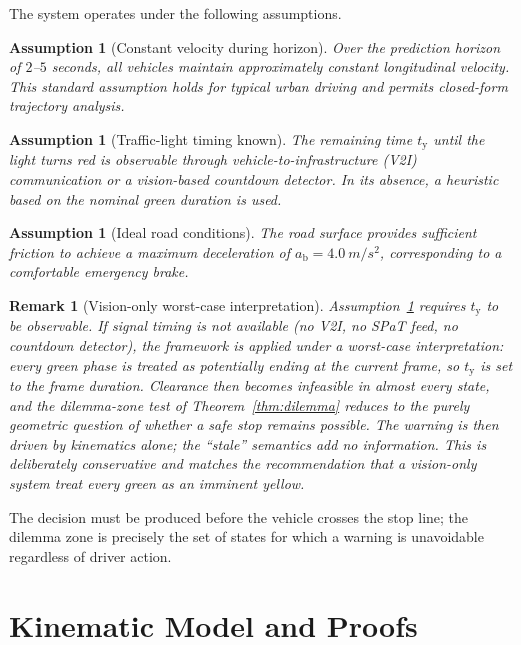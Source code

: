\documentclass[conference, a4paper]{IEEEtran}
\theoremstyle{plain}
\newtheorem{assumption}[theorem]{Assumption}
\newtheorem{remark}[theorem]{Remark}
\newcommand{\tred}{t_{\mathrm{y}}}
\newcommand{\ab}{a_{\mathrm{b}}}
\begin{document}
The system operates under the following assumptions.

\begin{assumption}[Constant velocity during horizon]
\label{asm:cv}
Over the prediction horizon of $2$--$5$ seconds, all vehicles maintain
approximately constant longitudinal velocity. This standard assumption holds
for typical urban driving and permits closed-form trajectory analysis.
\end{assumption}

\begin{assumption}[Traffic-light timing known]
\label{asm:signal}
The remaining time $\tred$ until the light turns red is observable through
vehicle-to-infrastructure (V2I) communication or a vision-based countdown
detector. In its absence, a heuristic based on the nominal green duration is
used.
\end{assumption}

\begin{assumption}[Ideal road conditions]
\label{asm:braking}
The road surface provides sufficient friction to achieve a maximum
deceleration of $\ab = 4.0~\si{m/s^2}$, corresponding to a comfortable
emergency brake.
\end{assumption}

\begin{remark}[Vision-only worst-case interpretation]
\label{rem:worstcase}
Assumption~\ref{asm:signal} requires $\tred$ to be observable. If signal
timing is not available (no V2I, no SPaT feed, no countdown detector), the
framework is applied under a worst-case interpretation: every green phase is
treated as potentially ending at the current frame, so $\tred$ is set to the
frame duration. Clearance then becomes infeasible in almost every state, and
the dilemma-zone test of Theorem~\ref{thm:dilemma} reduces to the purely
geometric question of whether a safe stop remains possible. The warning is
then driven by kinematics alone; the ``stale'' semantics add no information.
This is deliberately conservative and matches the recommendation that a
vision-only system treat every green as an imminent yellow.
\end{remark}

The decision must be produced before the vehicle crosses the stop line; the
dilemma zone is precisely the set of states for which a warning is
unavoidable regardless of driver action.

\section{Kinematic Model and Proofs}
\label{sec:kinematics}
\end{document}
